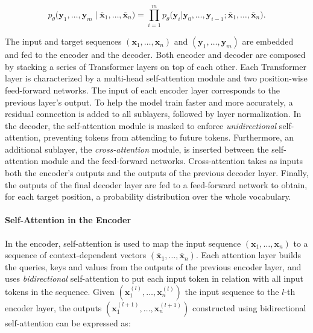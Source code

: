 \begin{equation}
    p_{\theta} \bigl( \bm{y}_1, \ldots, \bm{y}_m \mid \overline{\bm{x}}_1, \ldots, \overline{\bm{x}}_n \bigr) = \prod_{i=1}^{m} p_{\theta}\bigl(\bm{y}_i |\bm{y}_0, \ldots, \bm{y}_{i-1}; \overline{\bm{x}}_1, \ldots, \overline{\bm{x}}_n\bigr).
\end{equation}

The input and target sequences $(\bm{x}_1, \ldots, \bm{x}_n)$ and $(\bm{y}_1, \ldots, \bm{y}_m)$ are embedded and fed to the encoder and the decoder. Both encoder and decoder are composed by stacking a series of Transformer layers on top of each other. Each Transformer layer is characterized by a multi-head self-attention module and two position-wise feed-forward networks. The input of each encoder layer corresponds to the previous layer's output. To help the model train faster and more accurately, a residual connection \citep{he2016deep} is added to all sublayers, followed by layer normalization. In the decoder, the self-attention module is masked to enforce \textit{unidirectional} self-attention, preventing tokens from attending to future tokens. Furthermore, an additional sublayer, the \textit{cross-attention} module, is inserted between the self-attention module and the feed-forward networks. Cross-attention takes as inputs both the encoder's outputs and the outputs of the previous decoder layer. Finally, the outputs of the final decoder layer are fed to a feed-forward network to obtain, for each target position, a probability distribution over the whole vocabulary.




\paragraph{Self-Attention in the Encoder} In the encoder, self-attention is used to map the input sequence $(\bm{x}_1, \ldots, \bm{x}_n)$ to a sequence of context-dependent vectors $(\overline{\bm{x}}_1, \ldots, \overline{\bm{x}}_n)$. Each attention layer builds the queries, keys and values from the outputs of the previous encoder layer, and uses \textit{bidirectional} self-attention to put each input token in relation with all input tokens in the sequence. Given $(\bm{x}^{(l)}_1, \ldots, \bm{x}^{(l)}_n)$ the input sequence to the $l$-th encoder layer, the outputs $(\bm{x}^{(l+1)}_1, \ldots, \bm{x}^{(l+1)}_n)$ constructed using bidirectional self-attention can be expressed as:

